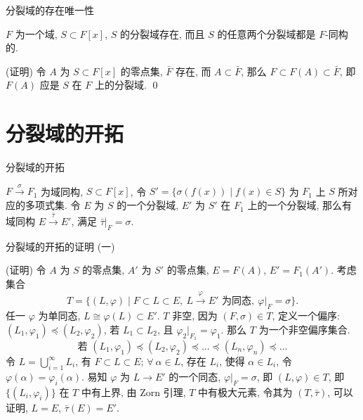 
\begin{frame}{分裂域的存在唯一性}

\begin{thm}[分裂域的存在唯一性]
$F$ 为一个域, $S \subset F[x]$, $S$ 的分裂域存在,
而且 $S$ 的任意两个分裂域都是 $F$-同构的.
\end{thm}

\startproof[bg=yellow, fg=red](证明)
令 $A$ 为 $S \subset F[x]$ 的零点集, $\bar{F}$ 存在, 而 $A \subset \bar{F}$,
那么 $F \subset F(A) \subset \bar{F}$, 即 $F(A)$ 应是 $S$ 在 $F$ 上的分裂域.
\qed

\end{frame}


\section[开拓]{分裂域的开拓}


\begin{frame}{分裂域的开拓}

\begin{lem}[分裂域的开拓]
$F \xrightarrow{\ \sigma\ } F_1$ 为域同构, $S \subset F[x]$,
令 $S' = \{ \sigma(f(x)) \mid f(x) \in S \}$ 为 $F_1$ 上 $S$ 所对应的多项式集.
令 $E$ 为 $S$ 的一个分裂域, $E'$ 为 $S'$ 在 $F_1$ 上的一个分裂域,
那么有域同构 $E \xrightarrow{\ \bar{\tau}\ } E'$, 满足 $\bar{\tau}|_F = \sigma$.
\end{lem}

\end{frame}


\begin{frame}{分裂域的开拓的证明 (一)}

\startproof[bg=yellow, fg=red](证明)
令 $A$ 为 $S$ 的零点集, $A'$ 为 $S'$ 的零点集, $E = F(A)$, $E' = F_1(A')$.
考虑集合
\[
T = \{ (L, \varphi) \mid F \subset L \subset E,\
L \xrightarrow{\ \varphi\ } E' \text{ 为同态},\ \varphi|_F = \sigma \}.
\]
任一 $\varphi$ 为单同态, $L \cong \varphi(L) \subset E'$.
$T$ 非空, 因为 $(F, \sigma) \in T$, 定义一个偏序:
$(L_1, \varphi_1) \preccurlyeq (L_2, \varphi_2)$,
若 $L_1 \subset L_2$, 且 $\varphi_2|_{F_1} = \varphi_1$.
那么 $T$ 为一个非空偏序集合.
\[
\text{若 } (L_1, \varphi_1) \preccurlyeq (L_2, \varphi_2) \preccurlyeq \dots
\preccurlyeq (L_n, \varphi_n) \preccurlyeq \dots
\]
令 $L = \bigcup_{i=1}^{\infty} L_i$, 有 $F \subset L \subset E$;
$\forall\ \alpha \in L$, 存在 $L_i$, 使得 $\alpha \in L_i$,
令 $\varphi(\alpha) = \varphi_i(\alpha)$.
易知 $\varphi$ 为 $L \to E'$ 的一个同态, $\varphi|_F = \sigma$, 即 $(L, \varphi) \in T$,
即 $\{ (L_i, \varphi_i) \}$ 在 $T$ 中有上界, 由 Zorn 引理,
$T$ 中有极大元素, 令其为 $(T, \bar{\tau})$, 可以证明, $L = E$, $\bar{\tau}(E) = E'$.

\end{frame}

